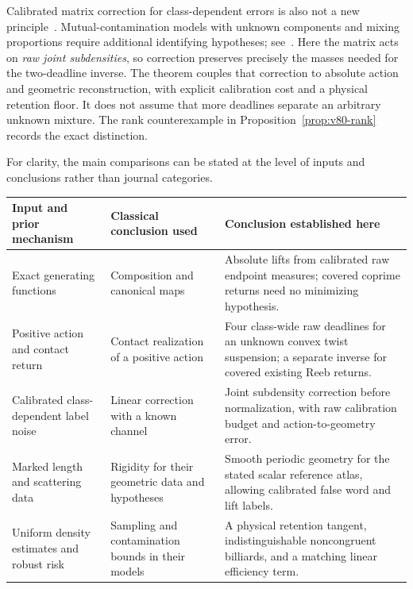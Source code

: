 Calibrated matrix correction for class-dependent errors is also not a
new principle~\cite{Patrini2017}.  Mutual-contamination models with
unknown components and mixing proportions require additional
identifying hypotheses; see~\cite{KatzSamuelsBlanchardScott2019}.
Here the matrix acts on \emph{raw joint subdensities}, so correction
preserves precisely the masses needed for the two-deadline inverse.
The theorem couples that correction to absolute action and geometric
reconstruction, with explicit calibration cost and a physical
retention floor.  It does not assume that more deadlines separate an
arbitrary unknown mixture.  The rank counterexample in
Proposition~\ref{prop:v80-rank} records the exact distinction.

For clarity, the main comparisons can be stated at the level of inputs
and conclusions rather than journal categories.
\begin{center}
\small
\begin{tabular}{>{\raggedright\arraybackslash}p{}>{\raggedright\arraybackslash}p{}>{\raggedright\arraybackslash}p{}}
\toprule
Input and prior mechanism & Classical conclusion used & Conclusion established here\\
\midrule
Exact generating functions
\cite{MarsdenWest2001,LallWest2006}
& Composition and canonical maps
& Absolute lifts from calibrated raw endpoint measures; covered coprime
returns need no minimizing hypothesis.\\[3pt]
Positive action and contact return
\cite{Hutchings2016}
& Contact realization of a positive action
& Four class-wide raw deadlines for an unknown convex twist suspension;
a separate inverse for covered existing Reeb returns.\\[3pt]
Calibrated class-dependent label noise
\cite{Patrini2017}
& Linear correction with a known channel
& Joint subdensity correction before normalization, with raw calibration
budget and action-to-geometry error.\\[3pt]
Marked length and scattering data
\cite{DeSimoiKaloshinLeguil2023,NoakesStoyanov2020,FinamoreLeguil}
& Rigidity for their geometric data and hypotheses
& Smooth periodic geometry for the stated scalar reference atlas,
allowing calibrated false word and lift labels.\\[3pt]
Uniform density estimates and robust risk
\cite{GineGuillou2002,GineNickl2009,UppalSinghPoczos2020}
& Sampling and contamination bounds in their models
& A physical retention tangent, indistinguishable noncongruent billiards,
and a matching linear efficiency term.\\
\bottomrule
\end{tabular}
\end{center}

